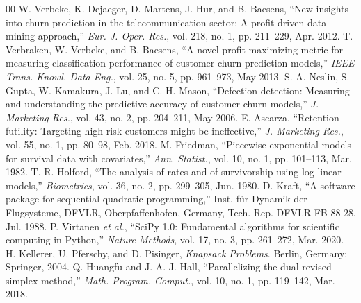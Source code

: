 \documentclass[conference]{IEEEtran}
\begin{document}
\begin{thebibliography}{00}
 W. Verbeke, K. Dejaeger, D. Martens, J. Hur, and B. Baesens, ``New insights into churn prediction in the telecommunication sector: A profit driven data mining approach,'' \textit{Eur. J. Oper. Res.}, vol. 218, no. 1, pp. 211--229, Apr. 2012.
 T. Verbraken, W. Verbeke, and B. Baesens, ``A novel profit maximizing metric for measuring classification performance of customer churn prediction models,'' \textit{IEEE Trans. Knowl. Data Eng.}, vol. 25, no. 5, pp. 961--973, May 2013.
 S. A. Neslin, S. Gupta, W. Kamakura, J. Lu, and C. H. Mason, ``Defection detection: Measuring and understanding the predictive accuracy of customer churn models,'' \textit{J. Marketing Res.}, vol. 43, no. 2, pp. 204--211, May 2006.
 E. Ascarza, ``Retention futility: Targeting high-risk customers might be ineffective,'' \textit{J. Marketing Res.}, vol. 55, no. 1, pp. 80--98, Feb. 2018.
 M. Friedman, ``Piecewise exponential models for survival data with covariates,'' \textit{Ann. Statist.}, vol. 10, no. 1, pp. 101--113, Mar. 1982.
 T. R. Holford, ``The analysis of rates and of survivorship using log-linear models,'' \textit{Biometrics}, vol. 36, no. 2, pp. 299--305, Jun. 1980.
 D. Kraft, ``A software package for sequential quadratic programming,'' Inst. f\"{u}r Dynamik der Flugsysteme, DFVLR, Oberpfaffenhofen, Germany, Tech. Rep. DFVLR-FB 88-28, Jul. 1988.
 P. Virtanen \textit{et al.}, ``SciPy 1.0: Fundamental algorithms for scientific computing in Python,'' \textit{Nature Methods}, vol. 17, no. 3, pp. 261--272, Mar. 2020.
 H. Kellerer, U. Pferschy, and D. Pisinger, \textit{Knapsack Problems}. Berlin, Germany: Springer, 2004.
 Q. Huangfu and J. A. J. Hall, ``Parallelizing the dual revised simplex method,'' \textit{Math. Program. Comput.}, vol. 10, no. 1, pp. 119--142, Mar. 2018.
\end{thebibliography}
\end{document}
